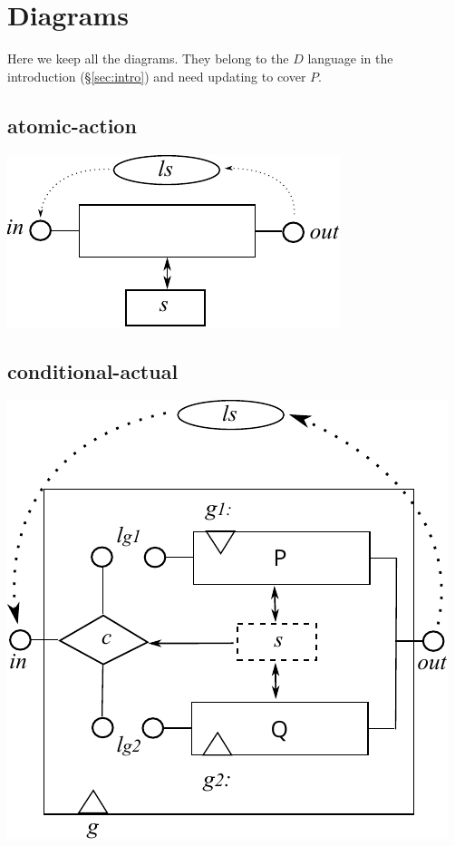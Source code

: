 \section{Diagrams}


Here we keep all the diagrams.
They belong to the $D$ language in the introduction (\S\ref{sec:intro})
and need updating to cover $P$.

\subsection{atomic-action}
\includegraphics{images/atomic-action}

\subsection{conditional-actual}
\includegraphics{images/conditional-actual}

